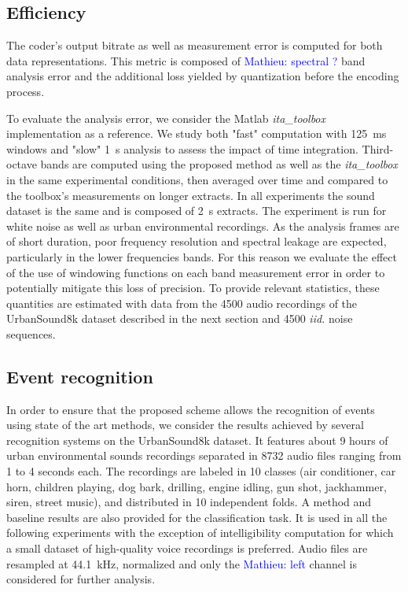 \documentclass[sensors,article,submit,moreauthors,pdftex,10pt,a4paper]{mdpi}
\newcommand{\ml}[1]{\textcolor{blue}{ Mathieu: #1}}
\begin{document}
\subsection{Efficiency}

The coder's output bitrate as well as measurement error is computed for both data representations. This metric is composed of \ml{spectral ?} band analysis error and the additional loss yielded by quantization before the encoding process.


To evaluate the analysis error, we consider the Matlab \textit{ita\_toolbox} implementation \cite{itatoolbox2017} as a reference. We study both "fast" computation with 125~ms windows and "slow" 1~s analysis to assess the impact of time integration. Third-octave bands are computed using the proposed method as well as the \textit{ita\_toolbox} in the same experimental conditions, then averaged over time and compared to the toolbox's measurements on longer extracts. In all experiments the sound dataset is the same and is composed of 2~s extracts. The experiment is run for white noise as well as urban environmental recordings. As the analysis frames are of short duration, poor frequency resolution and spectral leakage are expected, particularly in the lower frequencies bands. For this reason we evaluate the effect of the use of windowing functions on each band measurement error in order to potentially mitigate this loss of precision. To provide relevant statistics, these quantities are estimated with data from the 4500 audio recordings of the UrbanSound8k dataset \cite{salamon2014} described in the next section and 4500 \textit{iid.} noise sequences.

\subsection{Event recognition}

In order to ensure that the proposed scheme allows the recognition of events using state of the art methods, we consider the results achieved by several recognition systems on the UrbanSound8k dataset\cite{salamon2014}. It features about 9 hours of urban environmental sounds recordings separated in 8732 audio files ranging from 1 to 4 seconds each. The recordings are labeled in 10 classes (air conditioner, car horn, children playing, dog bark, drilling, engine idling, gun shot, jackhammer, siren, street music), and distributed in 10 independent folds. A method and baseline results are also provided for the classification task. It is used in all the following experiments with the exception of intelligibility computation for which a small dataset of high-quality voice recordings is preferred. Audio files are resampled at 44.1~kHz, normalized and only the \ml{left} channel is considered for further analysis.
\end{document}
